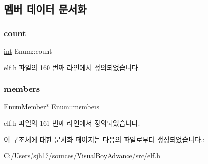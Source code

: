 \subsection{멤버 데이터 문서화}
\mbox{\label{struct_enum_abe9638dad7a7d68bde2843b2b80c8659}} 
\subsubsection{\texorpdfstring{count}{count}}
{\footnotesize\ttfamily \mbox{\hyperlink{_util_8cpp_a0ef32aa8672df19503a49fab2d0c8071}{int}} Enum\+::count}



elf.\+h 파일의 160 번째 라인에서 정의되었습니다.

\mbox{\label{struct_enum_ab6bd4304bb7b4f66498268417ca1ef00}} 
\subsubsection{\texorpdfstring{members}{members}}
{\footnotesize\ttfamily \mbox{\hyperlink{struct_enum_member}{Enum\+Member}}$\ast$ Enum\+::members}



elf.\+h 파일의 161 번째 라인에서 정의되었습니다.



이 구조체에 대한 문서화 페이지는 다음의 파일로부터 생성되었습니다.\+:\begin{DoxyCompactItemize}
\item 
C\+:/\+Users/sjh13/sources/\+Visual\+Boy\+Advance/src/\mbox{\hyperlink{elf_8h}{elf.\+h}}\end{DoxyCompactItemize}

